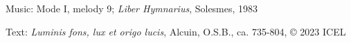 

\begin{hymnsource}
Music: Mode I, melody 9; \emph{Liber Hymnarius}, Solesmes, 1983

Text: \emph{Luminis fons, lux et origo lucis}, Alcuin, O.S.B., ca. 735-804, © 2023 ICEL
\end{hymnsource}
